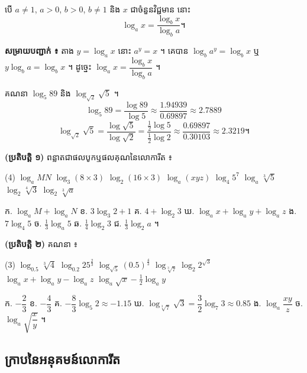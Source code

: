 \begin{formulaBox}[រូបមន្តប្ដូរគោល]
បើ $a \ne 1$, $a > 0$, $b > 0$, $b \ne 1$ និង $x$ ជាចំនួនវិជ្ជមាន នោះ
\[
\log_a x = \frac{\log_b x}{\log_b a} ។
\]
\end{formulaBox}
\textbf{សម្រាយបញ្ជាក់ ៖} តាង $y = \log_a x$ នោះ $a^y = x$ ។ គេបាន $\log_b a^y = \log_b x$ ឬ $y\log_b a = \log_b x$ ។ ដូច្នេះ $\log_a x = \dfrac{\log_b x}{\log_b a}$ ។

\begin{example}[លំហាត់គំរូ ២]
គណនា $\log_5 89$ និង $\log_{\sqrt{2}}\sqrt{5}$ ។
\ans
\[
\log_5 89 = \frac{\log 89}{\log 5} \approx \frac{1.94939}{0.69897} \approx 2.7889
\]
\[
\log_{\sqrt{2}}\sqrt{5} = \frac{\log\sqrt{5}}{\log\sqrt{2}} = \frac{\frac{1}{2}\log 5}{\frac{1}{2}\log 2} \approx \frac{0.69897}{0.30103} \approx 2.3219 ។
\]
\end{example}

\begin{pro}
\textbf{(ប្រតិបត្តិ ១)} ពន្លាតជាផលបូកឬផលគុណនៃលោការីត ៖
\begin{tasks}(4)
  \task $\log_a MN$
  \task $\log_3(8\times 3)$
  \task $\log_2(16\times 3)$
  \task $\log_a(xyz)$
  \task $\log_4 5^7$
  \task $\log_a\sqrt[3]{5}$
  \task $\log_2\sqrt[4]{3}$
  \task $\log_2\sqrt[3]{a}$
\end{tasks}
\ans
ក. $\log_a M + \log_a N$ \quad ខ. $3\log_3 2 + 1$ \quad គ. $4 + \log_2 3$ \quad ឃ. $\log_a x + \log_a y + \log_a z$ \quad ង. $7\log_4 5$ \quad ច. $\frac{1}{3}\log_a 5$ \quad ឆ. $\frac{1}{4}\log_2 3$ \quad ជ. $\frac{1}{3}\log_2 a$ ។
\end{pro}

\begin{pro}
\textbf{(ប្រតិបត្តិ ២)} គណនា ៖
\begin{tasks}(3)
  \task $\log_{0.5}\sqrt[3]{4}$
  \task $\log_{0.2} 25^{\frac{2}{3}}$
  \task $\log_{\sqrt{5}}(0.5)^{\frac{4}{3}}$
  \task $\log_{\sqrt[3]{7}}\log_2 2^{\sqrt{3}}$
  \task $\log_a x + \log_a y - \log_a z$
  \task $\log_a\sqrt{x} - \frac{1}{2}\log_a y$
\end{tasks}
\ans
ក. $-\dfrac{2}{3}$ \quad ខ. $-\dfrac{4}{3}$ \quad គ. $-\dfrac{8}{3}\log_5 2 \approx -1.15$ \quad ឃ. $\log_{\sqrt[3]{7}}\sqrt{3} = \dfrac{3}{2}\log_7 3 \approx 0.85$ \quad ង. $\log_a\dfrac{xy}{z}$ \quad ច. $\log_a\sqrt{\dfrac{x}{y}}$ ។
\end{pro}

\subsection{ក្រាបនៃអនុគមន៍លោការីត}

